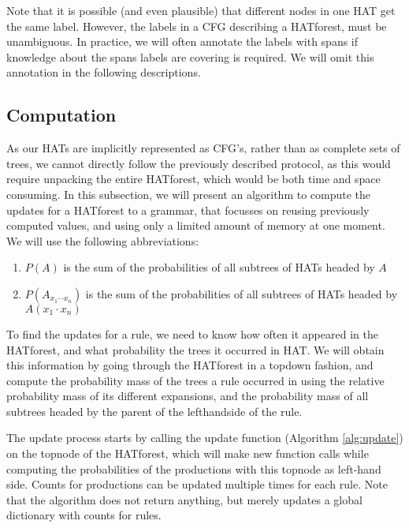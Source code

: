 \documentclass{article}
\begin{document}
\noindent Note that it is possible (and even plausible) that different nodes in one HAT get the same label. However, the labels in a CFG describing a HATforest, must be unambiguous. In practice, we will often annotate the labels with spans if knowledge about the spans labels are covering is required. We will omit this annotation in the following descriptions.

\subsection{Computation}

As our HATs are implicitly represented as CFG's, rather than as complete sets of trees, we cannot directly follow the previously described protocol, as this would require unpacking the entire HATforest, which would be both time and space consuming. In this subsection, we will present an algorithm to compute the updates for a HATforest to a grammar, that focusses on reusing previously computed values, and using only a limited amount of memory at one moment. We will use the following abbreviations:\begin{enumerate}
\item $P(A)$ is the sum of the probabilities of all subtrees of HATs headed by $A$
\item $P(A_{x_1\cdots x_n})$ is the sum of the probabilities of all subtrees of HATs headed by $A (x_1 \cdot x_n)$
\end{enumerate}

To find the updates for a rule, we need to know how often it appeared in the HATforest, and what probability the trees it occurred in HAT. We will obtain this information by going through the HATforest in a topdown fashion, and compute the probability mass of the trees a rule occurred in using the relative probability mass of its different expansions, and the probability mass of all subtrees headed by the parent of the lefthandside of the rule.

The update process starts by calling the update function (Algorithm \ref{alg:update}) on the topnode of the HATforest, which will make new function calls while computing the probabilities of the productions with this topnode as left-hand side. Counts for productions can be updated multiple times for each rule. Note that the algorithm does not return anything, but merely updates a global dictionary with counts for rules.
\end{document}
